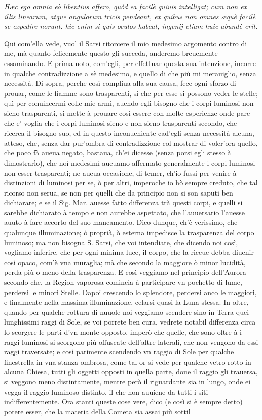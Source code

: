 \documentclass[11pt,twoside,openany]{book}
\begin{document}
\textit{Hæc ego omnia eò libentius affero, quòd ea facilè quiuis intelligat; cum non ex illis linearum, atque angulorum tricis pendeant, ex quibus non omnes æquè facilè se expedire norunt. hic enim si quis oculos habeat, ingenij etiam huic abundè erit.}


Qui com'ella vede, vuol il Sarsi ritorcere il mio medesimo argomento contro di me, mà quanto felicemente questo gli succeda, anderemo breuemente essaminando. E prima noto, com'egli, per effettuar questa sua intenzione, incorre in qualche contradizzione a sè medesimo, e quello di che più mi merauiglio, senza necessità. Di sopra, perche così compliua alla sua causa, fece ogni sforzo di prouar, come le fiamme sono trasparenti, si che per esse si possono veder le stelle; quì per conuincermi colle mie armi, auendo egli bisogno che i corpi luminosi non sieno trasparenti, si mette à prouare così essere con molte esperienze onde pare che e' voglia che i corpi luminosi sieno e non sieno trasparenti secondo, che ricerca il bisogno suo, ed in questo inconueniente cad'egli senza necessità alcuna, atteso, che, senza dar pur'ombra di contradizzione col mostrar di voler'ora quello, che poco fà aueua negato, bastaua, ch'ei dicesse (senza porsi egli stesso à dimostrarlo), che noi medesimi aueuamo affermato generalmente i corpi luminosi non esser trasparenti; ne aueua occasione, di temer, ch'io fussi per venire à distinzioni di luminosi per se, ò per altri, imperoche io hò sempre creduto, che tal ricorso non serua, se non per quelli che da principio non si son saputi ben dichiarare; e se il Sig. Mar. auesse fatto differenza trà questi corpi, e quelli si sarebbe dichiarato à tempo e non aurebbe aspettato, che l'auuersario l'auesse auuto à fare accorto del suo mancamento. Dico dunque, ch'è verissimo, che qualunque illuminazione; ò proprià, ò esterna impedisce la trasparenza del corpo luminoso; ma non bisogna S. Sarsi, che voi intendiate, che dicendo noi così, vogliamo inferire, che per ogni minima luce, il corpo, che la riceue debba diuenir così opaco, com'è vna muraglia; mà che secondo la maggiore ò minor lucidità, perda più o meno della trasparenza. E così veggiamo nel principio dell'Aurora secondo che, la Region vaporosa comincia à participare vn pochetto di lume, perdersi le minori Stelle. Dapoi crescendo lo splendore, perdersi anco le maggiori, e finalmente nella massima illuminazione, celarsi quasi la Luna stessa. In oltre, quando per qualche rottura di nuuole noi veggiamo scendere sino in Terra quei lunghissimi raggi di Sole, se voi porrete ben cura, vedrete notabil differenza circa lo scorgere le parti d'vn monte opposto, imperò che quelle, che sono oltre à i raggi luminosi si scorgono più offuscate dell'altre laterali, che non vengono da essi raggi traversate; e così parimente scendendo vn raggio di Sole per qualche finestrella in vna stanza ombrosa, come tal or si vede per qualche vetro rotto in alcuna Chiesa, tutti gli oggetti opposti in quella parte, doue il raggio gli trauersa, si veggono meno distintamente, mentre però il riguardante sia in lungo, onde ei vegga il raggio luminoso distinto, il che non auuiene da tutti i siti indifferentemente. Ora stanti queste cose vere, dico (e così si è sempre detto) potere esser, che la materia della Cometa sia assai più sottil 
\end{document}

